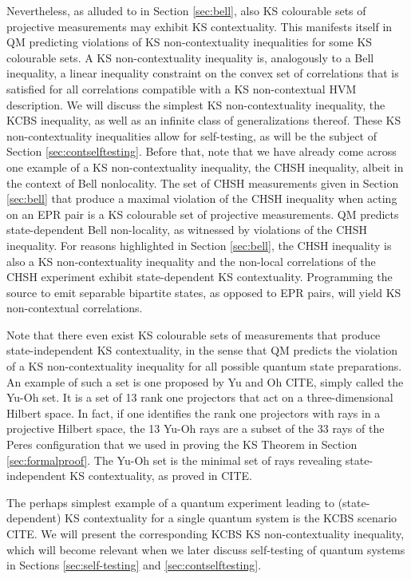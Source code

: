 Nevertheless, as alluded to in Section \ref{sec:bell}, also KS colourable sets of projective measurements may exhibit KS contextuality. This manifests itself in QM predicting violations of KS non-contextuality inequalities for some KS colourable sets. A KS non-contextuality inequality is, analogously to a Bell inequality, a linear inequality constraint on the convex set of correlations that is satisfied for all correlations compatible with a KS non-contextual HVM description. We will discuss the simplest KS non-contextuality inequality, the KCBS inequality, as well as an infinite class of generalizations thereof. These KS non-contextuality inequalities allow for self-testing, as will be the subject of Section \ref{sec:contselftesting}. Before that, note that we have already come across one example of a KS non-contextuality inequality, the CHSH inequality, albeit in the context of Bell nonlocality. The set of CHSH measurements given in Section \ref{sec:bell} that produce a maximal violation of the CHSH inequality when acting on an EPR pair is a KS colourable set of projective measurements. QM predicts state-dependent Bell non-locality, as witnessed by violations of the CHSH inequality. For reasons highlighted in Section \ref{sec:bell}, the CHSH inequality is also a KS non-contextuality inequality and the non-local correlations of the CHSH experiment exhibit state-dependent KS contextuality. Programming the source to emit separable bipartite states, as opposed to EPR pairs, will yield KS non-contextual correlations.

Note that there even exist KS colourable sets of measurements that produce state-independent KS contextuality, in the sense that QM predicts the violation of a KS non-contextuality inequality for all possible quantum state preparations. An example of such a set is one proposed by Yu and Oh CITE, simply called the Yu-Oh set. It is a set of 13 rank one projectors that act on a three-dimensional Hilbert space. In fact, if one identifies the rank one projectors with rays in a projective Hilbert space, the 13 Yu-Oh rays are a subset of the 33 rays of the Peres configuration that we used in proving the KS Theorem in Section \ref{sec:formalproof}. The Yu-Oh set is the minimal set of rays revealing state-independent KS contextuality, as proved in CITE.

The perhaps simplest example of a quantum experiment leading to (state-dependent) KS contextuality for a single quantum system is the KCBS scenario CITE. We will present the corresponding KCBS KS non-contextuality inequality, which will become relevant when we later discuss self-testing of quantum systems in Sections \ref{sec:self-testing} and \ref{sec:contselftesting}. 

